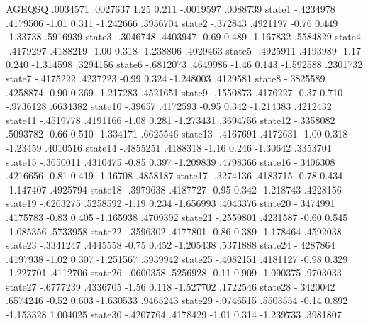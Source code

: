       AGEQSQ {\VBAR}   .0034571   .0027637     1.25   0.211    -.0019597    .0088739
      state1 {\VBAR}  -.4234978   .4179506    -1.01   0.311    -1.242666    .3956704
      state2 {\VBAR}   -.372843   .4921197    -0.76   0.449     -1.33738    .5916939
      state3 {\VBAR}  -.3046748   .4403947    -0.69   0.489    -1.167832    .5584829
      state4 {\VBAR}  -.4179297   .4188219    -1.00   0.318    -1.238806    .4029463
      state5 {\VBAR}  -.4925911   .4193989    -1.17   0.240    -1.314598    .3294156
      state6 {\VBAR}  -.6812073   .4649986    -1.46   0.143    -1.592588    .2301732
      state7 {\VBAR}  -.4175222   .4237223    -0.99   0.324    -1.248003    .4129581
      state8 {\VBAR}  -.3825589   .4258874    -0.90   0.369    -1.217283    .4521651
      state9 {\VBAR}  -.1550873   .4176227    -0.37   0.710    -.9736128    .6634382
     state10 {\VBAR}    -.39657   .4172593    -0.95   0.342    -1.214383    .4212432
     state11 {\VBAR}  -.4519778   .4191166    -1.08   0.281    -1.273431    .3694756
     state12 {\VBAR}  -.3358082   .5093782    -0.66   0.510    -1.334171    .6625546
     state13 {\VBAR}  -.4167691   .4172631    -1.00   0.318     -1.23459    .4010516
     state14 {\VBAR}  -.4855251   .4188318    -1.16   0.246     -1.30642    .3353701
     state15 {\VBAR}  -.3650011   .4310475    -0.85   0.397    -1.209839    .4798366
     state16 {\VBAR}  -.3406308   .4216656    -0.81   0.419     -1.16708    .4858187
     state17 {\VBAR}  -.3274136   .4183715    -0.78   0.434    -1.147407    .4925794
     state18 {\VBAR}  -.3979638   .4187727    -0.95   0.342    -1.218743    .4228156
     state19 {\VBAR}  -.6263275   .5258592    -1.19   0.234    -1.656993    .4043376
     state20 {\VBAR}  -.3474991   .4175783    -0.83   0.405    -1.165938    .4709392
     state21 {\VBAR}  -.2559801   .4231587    -0.60   0.545    -1.085356    .5733958
     state22 {\VBAR}  -.3596302   .4177801    -0.86   0.389    -1.178464    .4592038
     state23 {\VBAR}  -.3341247   .4445558    -0.75   0.452    -1.205438    .5371888
     state24 {\VBAR}  -.4287864   .4197938    -1.02   0.307    -1.251567    .3939942
     state25 {\VBAR}  -.4082151   .4181127    -0.98   0.329    -1.227701    .4112706
     state26 {\VBAR}  -.0600358   .5256928    -0.11   0.909    -1.090375    .9703033
     state27 {\VBAR}  -.6777239   .4336705    -1.56   0.118    -1.527702    .1722546
     state28 {\VBAR}  -.3420042   .6574246    -0.52   0.603    -1.630533    .9465243
     state29 {\VBAR}  -.0746515   .5503554    -0.14   0.892    -1.153328    1.004025
     state30 {\VBAR}  -.4207764   .4178429    -1.01   0.314    -1.239733    .3981807
